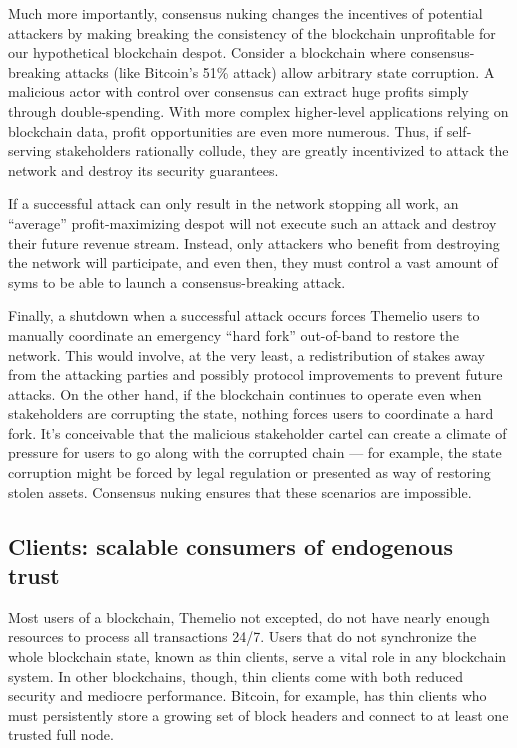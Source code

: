 \documentclass[letterpaper,12pt,oneside]{article}
\begin{document}
Much more importantly, consensus nuking changes the incentives of potential attackers by making breaking the consistency of the blockchain unprofitable for our hypothetical blockchain despot. Consider a blockchain where consensus-breaking attacks (like Bitcoin's 51\% attack) allow arbitrary state corruption. A malicious actor with control over consensus can extract huge profits simply through double-spending. With more complex higher-level applications relying on blockchain data, profit opportunities are even more numerous. Thus, if self-serving stakeholders rationally collude, they are greatly incentivized to attack the network and destroy its security guarantees.

If a successful attack can only result in the network stopping all work, an ``average'' profit-maximizing despot will not execute such an attack and destroy their future revenue stream. Instead, only attackers who benefit from destroying the network will participate, and even then, they must control a vast amount of syms to be able to launch a consensus-breaking attack.

Finally, a shutdown when a successful attack occurs forces Themelio users to manually coordinate an emergency ``hard fork'' out-of-band to restore the network. This would involve, at the very least, a redistribution of stakes away from the attacking parties and possibly protocol improvements to prevent future attacks. On the other hand, if the blockchain continues to operate even when stakeholders are corrupting the state, nothing forces users to coordinate a hard fork. It's conceivable that the malicious stakeholder cartel can create a climate of pressure for users to go along with the corrupted chain --- for example, the state corruption might be forced by legal regulation or presented as way of restoring stolen assets. Consensus nuking ensures that these scenarios are impossible.

\subsection{Clients: scalable consumers of endogenous trust}

Most users of a blockchain, Themelio not excepted, do not have nearly enough resources to process all transactions 24/7. Users that do not synchronize the whole blockchain state, known as thin clients, serve a vital role in any blockchain system. In other blockchains, though, thin clients come with both reduced security and mediocre performance. Bitcoin, for example, has thin clients who must persistently store a growing set of block headers and connect to at least one trusted full node.
\end{document}
